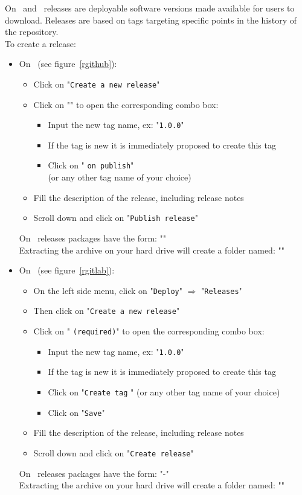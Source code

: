 On \github\ and \gitlab\ releases are deployable software versions made available for users to download. 
Releases are based on tags targeting specific points in the history of the repository. \\
To create a release: 
\begin{itemize}
\item On \github\ (see figure~\ref{rgithub}):
\begin{itemize}
\item Click on "\texttt{Create a new release}"
\item Click on "" to open the corresponding combo box:
\begin{itemize}
\item Input the new tag name, ex: "\texttt{1.0.0}" 
\item If the tag is new it is immediately proposed to create this tag
\item Click on "  \texttt{on publish}" \\
(or any other tag name of your choice)
\end{itemize}
\item Fill the description of the release, including release notes
\item Scroll down and click on "\texttt{Publish release}"
\end{itemize}
On \github\ releases packages have the form: "" \\
Extracting the archive on your hard drive will create a folder named: ""
\item On \gitlab\ (see figure~\ref{rgitlab}):
\begin{itemize}
\item On the left side menu, click on "\texttt{Deploy}" $\Longrightarrow$ "\texttt{Releases}"
\item Then click on "\texttt{Create a new release}"
\item Click on " \texttt{(required)}" to open the corresponding combo box:
\begin{itemize}
\item Input the new tag name, ex: "\texttt{1.0.0}" 
\item If the tag is new it is immediately proposed to create this tag
\item Click on "\texttt{Create tag} " (or any other tag name of your choice)
\item Click on "\texttt{Save}"
\end{itemize}
\item Fill the description of the release, including release notes
\item Scroll down and click on "\texttt{Create release}"
\end{itemize}
On \gitlab\ releases packages have the form: "-" \\
Extracting the archive on your hard drive will create a folder named: ""
\end{itemize}

